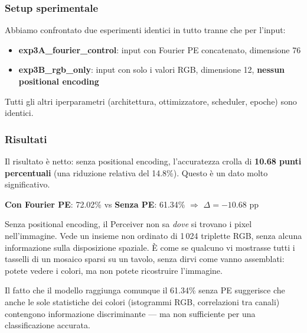 \documentclass[12pt,a4paper]{article}
\begin{document}
\subsubsection{Setup sperimentale}

Abbiamo confrontato due esperimenti identici in tutto tranne che per l'input:
\begin{itemize}
    \item \textbf{exp3A\_fourier\_control}: input con Fourier PE concatenato, dimensione 76
    \item \textbf{exp3B\_rgb\_only}: input con solo i valori RGB, dimensione 12, \textbf{nessun positional encoding}
\end{itemize}
Tutti gli altri iperparametri (architettura, ottimizzatore, scheduler, epoche) sono identici.

\subsubsection{Risultati}

\begin{center}
\end{center}

Il risultato \`e netto: senza positional encoding, l'accuratezza crolla di \textbf{10.68 punti percentuali} (una riduzione relativa del 14.8\%). Questo \`e un dato molto significativo.

\begin{examplebox}
\textbf{Con Fourier PE}: 72.02\% \quad vs \quad \textbf{Senza PE}: 61.34\% \quad $\Rightarrow$ \quad $\Delta = -10.68$ pp

Senza positional encoding, il Perceiver non sa \textit{dove} si trovano i pixel nell'immagine. Vede un insieme non ordinato di 1\,024 triplette RGB, senza alcuna informazione sulla disposizione spaziale. \`E come se qualcuno vi mostrasse tutti i tasselli di un mosaico sparsi su un tavolo, senza dirvi come vanno assemblati: potete vedere i colori, ma non potete ricostruire l'immagine.

Il fatto che il modello raggiunga comunque il 61.34\% senza PE suggerisce che anche le sole statistiche dei colori (istogrammi RGB, correlazioni tra canali) contengono informazione discriminante --- ma non sufficiente per una classificazione accurata.
\end{examplebox}
\end{document}
